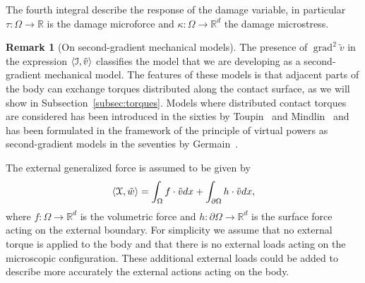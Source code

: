 \documentclass[a4paper,10pt,oneside]{amsbook}
\numberwithin{section}{chapter}
\numberwithin{equation}{chapter}
\theoremstyle{definition}
\newtheorem{rmk}[prop]{Remark}
\DeclareMathOperator{\grad}{grad}
\DeclarePairedDelimiter{\dual}{\langle}{\rangle}
\begin{document}
The fourth integral describe the response of the damage variable, in particular $\tau\colon\Omega\to\mathbb{R}$ is the damage microforce and $\kappa\colon\Omega\to\mathbb{R}^d$ the damage microstress.
\begin{rmk}[On second-gradient mechanical models]
The presence of $\grad^2\tilde v$ in the expression $\dual{\mathcal{I},\tilde v}$ classifies the model that we are developing as a second-gradient mechanical model. The features of these models is that adjacent parts of the body can exchange torques distributed along the contact surface, as we will show in Subsection~\ref{subsec:torques}. Models where distributed contact torques are considered has been introduced in the sixties by Toupin~\cite{toupin1962elastic} and Mindlin~\cite{mindlin1964microstructure} and has been formulated in the framework of the principle of virtual powers as second-gradient models in the seventies by Germain~\cite{germain}.
\end{rmk}
The external generalized force is assumed to be given by
\[
\dual{\mathcal{X},\tilde w}=\int_\Omega f\cdot\tilde vdx+\int_{\partial\Omega}h\cdot\tilde vdx,
\]
where $f\colon\Omega\to\mathbb{R}^d$ is the volumetric force and $h\colon\partial\Omega\to\mathbb{R}^d$ is the surface force acting on the external boundary. For simplicity we assume that no external torque is applied to the body and that there is no external loads acting on the microscopic configuration. These additional external loads could be added to describe more accurately the external actions acting on the body.
\end{document}
